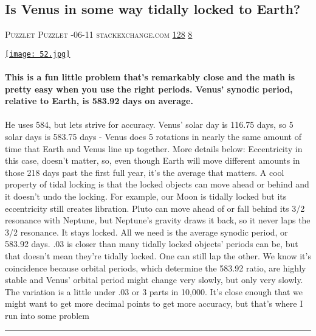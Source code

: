 \documentclass[10pt,a4paper]{article}
\begin{document}
\begin{multicols}{2}
\begin{minipage}{\linewidth}
\subsection{Is Venus in some way tidally locked to Earth?}
\textsc{\footnotesize
{\scriptsize\faUser}\space 
Puzzlet Puzzlet 
{\scriptsize\faCalendar}-06-11 
{\scriptsize\faGlobe}\space 
stackexchange.com 
{\scriptsize\faThumbsOUp}\space 
\href{http://news.ycombinator.com/item?id=37118114\&utm\_term=comment}{128} 
{\scriptsize\faComments}\space 
\href{http://news.ycombinator.com/item?id=37118114\&utm\_term=comment}{8} 
}
\par\medskip\noindent
\href{https://astronomy.stackexchange.com/questions/36488/is-venus-in-some-way-tidally-locked-to-earth?utm\_source=hackernewsletter\&utm\_medium=email\&utm\_term=learn}{
    \texttt{[image: 52.jpg]}
}
\end{minipage}
\paragraph{}
\textbf{This is a fun little problem that's remarkably close and the math is pretty easy when you use the right periods.
Venus' synodic period, relative to Earth, is 583.92 days on average.}
\paragraph{}
 He uses 584, but lets strive for accuracy. Venus' solar day is 116.75 days, so 5 solar days is 583.75 days - Venus does 5 rotations in nearly the same amount of time that Earth and Venus line up together.
More details below:
Eccentricity in this case, doesn't matter, so, even though Earth will move different amounts in those 218 days past the first full year, it's the average that matters.
A cool property of tidal locking is that the locked objects can move ahead or behind and it doesn't undo the locking. For example, our Moon is tidally locked but its eccentricity still creates libration. Pluto can move ahead of or fall behind its 3/2 resonance with Neptune, but Neptune's gravity draws it back, so it never laps the 3/2 resonance. It stays locked. All we need is the average synodic period, or 583.92 days.
.03 is closer than many tidally locked objects' periods can be, but that doesn't mean they're tidally locked. One can still lap the other.
We know it's coincidence because orbital periods, which determine the 583.92 ratio, are highly stable and Venus' orbital period might change very slowly, but only very slowly.
The variation is a little under .03 or 3 parts in 10,000. It's close enough that we might want to get more decimal points to get more accuracy, but that's where I run into some problem
\par\noindent\textcolor{red}{\rule{\linewidth}{0.2mm}}
\vfill
\null
\noindent\begin{minipage}{\linewidth}

\end{minipage}
\end{multicols}
\end{document}
